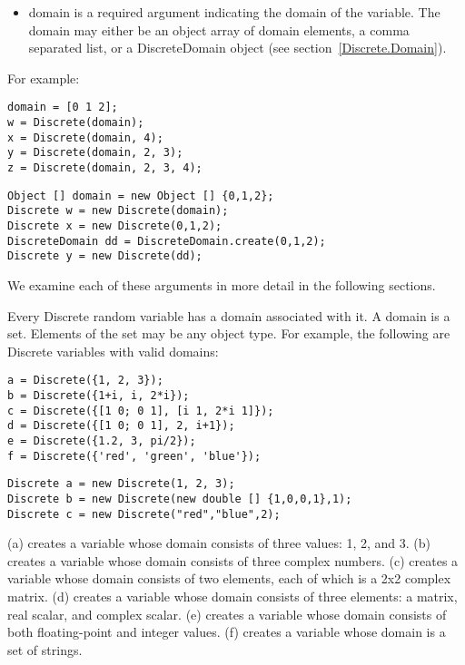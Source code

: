 \ifjava
\begin{itemize}
\item domain is a required argument indicating the domain of the variable.  The domain may either be an object array of domain elements, a comma separated list, or a DiscreteDomain object (see section~\ref{Discrete.Domain}).
\end{itemize}
\fi

For example:

\ifmatlab
\begin{lstlisting}
domain = [0 1 2];
w = Discrete(domain);
x = Discrete(domain, 4);
y = Discrete(domain, 2, 3);
z = Discrete(domain, 2, 3, 4);
\end{lstlisting}
\fi

\ifjava
\begin{lstlisting}
Object [] domain = new Object [] {0,1,2};
Discrete w = new Discrete(domain);
Discrete x = new Discrete(0,1,2);
DiscreteDomain dd = DiscreteDomain.create(0,1,2);
Discrete y = new Discrete(dd);
\end{lstlisting}
\fi

We examine each of these arguments in more detail in the following sections.

\label{Discrete.Domain}

Every Discrete random variable has a domain associated with it.  A domain is a set.  Elements of the set may be any object type.  For example, the following are Discrete variables with valid domains:

\ifmatlab
\begin{lstlisting}
a = Discrete({1, 2, 3});
b = Discrete({1+i, i, 2*i});
c = Discrete({[1 0; 0 1], [i 1, 2*i 1]});
d = Discrete({[1 0; 0 1], 2, i+1});
e = Discrete({1.2, 3, pi/2});
f = Discrete({'red', 'green', 'blue'});
\end{lstlisting}
\fi

\ifjava
\begin{lstlisting}
Discrete a = new Discrete(1, 2, 3);
Discrete b = new Discrete(new double [] {1,0,0,1},1); 
Discrete c = new Discrete("red","blue",2);
\end{lstlisting}
\fi

\ifmatlab
(a) creates a variable whose domain consists of three values: 1, 2, and 3.  (b) creates a variable whose domain consists of three complex numbers.  (c) creates a variable whose domain consists of two elements, each of which is a 2x2 complex matrix.  (d) creates a variable whose domain consists of three elements: a matrix, real scalar, and complex scalar.  (e) creates a variable whose domain consists of both floating-point and integer values.  (f) creates a variable whose domain is a set of strings.

